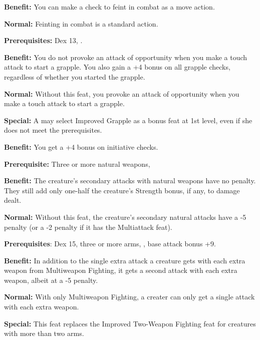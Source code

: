 \textbf{Benefit:} You can make a  check to feint in combat as a move action.

\textbf{Normal:} Feinting in combat is a standard action.


\textbf{Prerequisites:} Dex 13, .

\textbf{Benefit:} You do not provoke an attack of opportunity when you make a touch 
attack to start a grapple. You also gain a +4 bonus on all grapple checks, regardless 
of whether you started the grapple.

\textbf{Normal:} Without this feat, you provoke an attack of opportunity when you 
make a touch attack to start a grapple.

\textbf{Special:} A  may select Improved Grapple as a bonus feat at 1st level, even if she does 
not meet the prerequisites.


\textbf{Benefit:} You get a +4 bonus on initiative checks.


\textbf{Prerequisite:} Three or more natural weapons, 

\textbf{Benefit:} The creature's secondary attacks with natural weapons have no 
penalty. They still add only one-half the creature's Strength bonus, if any, to 
damage dealt.

\textbf{Normal:} Without this feat, the creature's secondary natural attacks have 
a -5 penalty (or a -2 penalty if it has the Multiattack feat).


\textbf{Prerequisites}: Dex 15, three or more arms, , base 
attack bonus +9.

\textbf{Benefit:} In addition to the single extra attack a creature gets with each 
extra weapon from Multiweapon Fighting, it gets a second attack with each extra 
weapon, albeit at a -5 penalty.

\textbf{Normal:} With only Multiweapon Fighting, a creater can only get a single 
attack with each extra weapon. 

\textbf{Special:} This feat replaces the Improved Two-Weapon Fighting feat for 
creatures with more than two arms.

